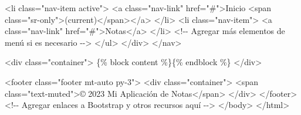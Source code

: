\documentclass[
  a4paper,
  DIV=11,
  numbers=noendperiod,
  onepage,
  openany]{scrreprt}
\newenvironment{Shaded}{\begin{snugshade}}{\end{snugshade}}
\newcommand{\CommentTok}[1]{\textcolor[rgb]{0.37,0.37,0.37}{#1}}
\newcommand{\DataTypeTok}[1]{\textcolor[rgb]{0.68,0.00,0.00}{#1}}
\newcommand{\KeywordTok}[1]{\textcolor[rgb]{0.00,0.23,0.31}{#1}}
\newcommand{\NormalTok}[1]{\textcolor[rgb]{0.00,0.23,0.31}{#1}}
\newcommand{\OperatorTok}[1]{\textcolor[rgb]{0.37,0.37,0.37}{#1}}
\newcommand{\OtherTok}[1]{\textcolor[rgb]{0.00,0.23,0.31}{#1}}
\newcommand{\StringTok}[1]{\textcolor[rgb]{0.13,0.47,0.30}{#1}}
\begin{document}
\begin{Shaded}
\begin{Highlighting}[]
                \DataTypeTok{\textless{}}\KeywordTok{li}\OtherTok{ class}\OperatorTok{=}\StringTok{"nav{-}item active"}\DataTypeTok{\textgreater{}}
                    \DataTypeTok{\textless{}}\KeywordTok{a}\OtherTok{ class}\OperatorTok{=}\StringTok{"nav{-}link"}\OtherTok{ href}\OperatorTok{=}\StringTok{"\#"}\DataTypeTok{\textgreater{}}\NormalTok{Inicio }\DataTypeTok{\textless{}}\KeywordTok{span}\OtherTok{ class}\OperatorTok{=}\StringTok{"sr{-}only"}\DataTypeTok{\textgreater{}}\NormalTok{(current)}\DataTypeTok{\textless{}/}\KeywordTok{span}\DataTypeTok{\textgreater{}\textless{}/}\KeywordTok{a}\DataTypeTok{\textgreater{}}
                \DataTypeTok{\textless{}/}\KeywordTok{li}\DataTypeTok{\textgreater{}}
                \DataTypeTok{\textless{}}\KeywordTok{li}\OtherTok{ class}\OperatorTok{=}\StringTok{"nav{-}item"}\DataTypeTok{\textgreater{}}
                    \DataTypeTok{\textless{}}\KeywordTok{a}\OtherTok{ class}\OperatorTok{=}\StringTok{"nav{-}link"}\OtherTok{ href}\OperatorTok{=}\StringTok{"\#"}\DataTypeTok{\textgreater{}}\NormalTok{Notas}\DataTypeTok{\textless{}/}\KeywordTok{a}\DataTypeTok{\textgreater{}}
                \DataTypeTok{\textless{}/}\KeywordTok{li}\DataTypeTok{\textgreater{}}
                \CommentTok{\textless{}!{-}{-} Agregar más elementos de menú si es necesario {-}{-}\textgreater{}}
            \DataTypeTok{\textless{}/}\KeywordTok{ul}\DataTypeTok{\textgreater{}}
        \DataTypeTok{\textless{}/}\KeywordTok{div}\DataTypeTok{\textgreater{}}
    \DataTypeTok{\textless{}/}\KeywordTok{nav}\DataTypeTok{\textgreater{}}

    \DataTypeTok{\textless{}}\KeywordTok{div}\OtherTok{ class}\OperatorTok{=}\StringTok{"container"}\DataTypeTok{\textgreater{}}
\NormalTok{        \{\% block content \%\}\{\% endblock \%\}}
    \DataTypeTok{\textless{}/}\KeywordTok{div}\DataTypeTok{\textgreater{}}

    \DataTypeTok{\textless{}}\KeywordTok{footer}\OtherTok{ class}\OperatorTok{=}\StringTok{"footer mt{-}auto py{-}3"}\DataTypeTok{\textgreater{}}
        \DataTypeTok{\textless{}}\KeywordTok{div}\OtherTok{ class}\OperatorTok{=}\StringTok{"container"}\DataTypeTok{\textgreater{}}
            \DataTypeTok{\textless{}}\KeywordTok{span}\OtherTok{ class}\OperatorTok{=}\StringTok{"text{-}muted"}\DataTypeTok{\textgreater{}}\NormalTok{© 2023 Mi Aplicación de Notas}\DataTypeTok{\textless{}/}\KeywordTok{span}\DataTypeTok{\textgreater{}}
        \DataTypeTok{\textless{}/}\KeywordTok{div}\DataTypeTok{\textgreater{}}
    \DataTypeTok{\textless{}/}\KeywordTok{footer}\DataTypeTok{\textgreater{}}
    \CommentTok{\textless{}!{-}{-} Agregar enlaces a Bootstrap y otros recursos aquí {-}{-}\textgreater{}}
\DataTypeTok{\textless{}/}\KeywordTok{body}\DataTypeTok{\textgreater{}}
\DataTypeTok{\textless{}/}\KeywordTok{html}\DataTypeTok{\textgreater{}}
\end{Highlighting}
\end{Shaded}
\end{document}
